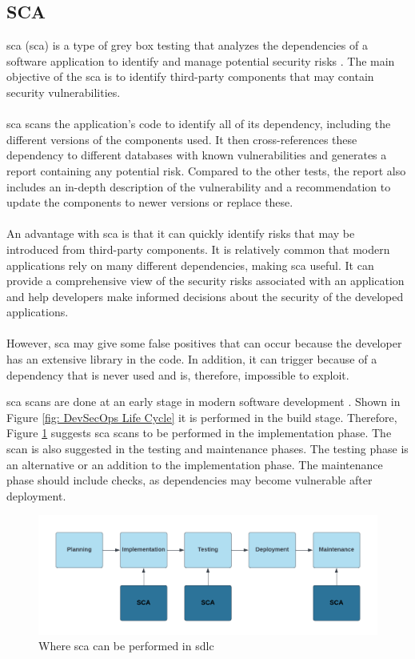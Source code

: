 \subsection{SCA}
\acrlong{sca} (\acrshort{sca}) is a type of grey box testing that analyzes the dependencies of a software application to identify and manage potential security risks \cite{sca}. The main objective of the \acrshort{sca} is to identify third-party components that may contain security vulnerabilities. 
\\~\\
\acrshort{sca} scans the application's code to identify all of its \gls{dependency}, including the different versions of the components used. It then cross-references these \gls{dependency} to different databases with known vulnerabilities and generates a report containing any potential risk. Compared to the other tests, the report also includes an in-depth description of the vulnerability and a recommendation to update the components to newer versions or replace these. 
\\~\\
An advantage with \acrshort{sca} is that it can quickly identify risks that may be introduced from third-party components. It is relatively common that modern applications rely on many different dependencies, making \acrshort{sca} useful. It can provide a comprehensive view of the security risks associated with an application and help developers make informed decisions about the security of the developed applications. 
\\~\\
However, \acrshort{sca} may give some false positives that can occur because the developer has an extensive library in the code. In addition, it can trigger because of a dependency that is never used and is, therefore, impossible to exploit.

\acrshort{sca} scans are done at an early stage in modern software development \cite{sca}. Shown in Figure \ref{fig: DevSecOps Life Cycle} it is performed in the build stage. Therefore, Figure \ref{fig: Where SCA can be performed in SDLC} suggests \acrshort{sca} scans to be performed in the implementation phase. The scan is also suggested in the testing and maintenance phases. The testing phase is an alternative or an addition to the implementation phase. The maintenance phase should include checks, as dependencies may become vulnerable after deployment.

\vspace{2mm}
\begin{figure}[H]
    \centering
    \includegraphics[width=0.8\columnwidth]{Images/sca.png}
    \caption{Where \acrshort{sca} can be performed in \acrshort{sdlc}} 
    \label{fig: Where SCA can be performed in SDLC}
\end{figure}

